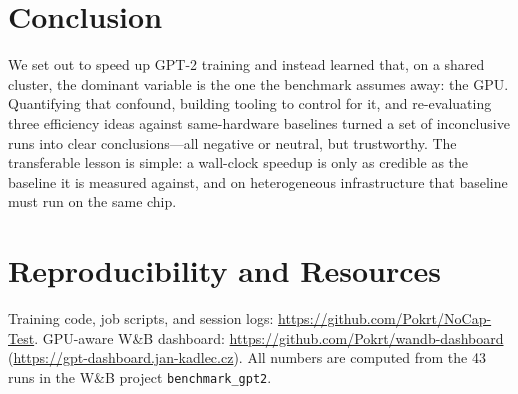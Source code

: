 \documentclass[11pt]{article}
\begin{document}
\section{Conclusion}

We set out to speed up GPT-2 training and instead learned that, on a shared
cluster, the dominant variable is the one the benchmark assumes away: the GPU.
Quantifying that confound, building tooling to control for it, and re-evaluating
three efficiency ideas against same-hardware baselines turned a set of
inconclusive runs into clear conclusions---all negative or neutral, but
trustworthy. The transferable lesson is simple: a wall-clock speedup is only as
credible as the baseline it is measured against, and on heterogeneous
infrastructure that baseline must run on the same chip.

\section*{Reproducibility and Resources}

Training code, job scripts, and session logs:
\url{https://github.com/Pokrt/NoCap-Test}. GPU-aware W\&B dashboard:
\url{https://github.com/Pokrt/wandb-dashboard}
(\url{https://gpt-dashboard.jan-kadlec.cz}). All numbers are computed from the 43
runs in the W\&B project \texttt{benchmark\_gpt2}.


\end{document}
